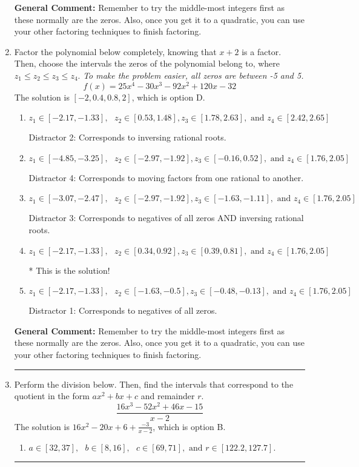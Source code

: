 \documentclass{extbook}[14pt]
\newcommand{\litem}[1]{\item #1

\rule{\textwidth}{0.4pt}}
\begin{document}
\begin{enumerate}
{\textbf{General Comment:} Remember to try the middle-most integers first as these normally are the zeros. Also, once you get it to a quadratic, you can use your other factoring techniques to finish factoring.
}
\litem{
Factor the polynomial below completely, knowing that $x + 2$ is a factor. Then, choose the intervals the zeros of the polynomial belong to, where $z_1 \leq z_2 \leq z_3 \leq z_4$. \textit{To make the problem easier, all zeros are between -5 and 5.}
\[ f(x) = 25x^{4} -30 x^{3} -92 x^{2} +120 x -32 \]The solution is \( [-2, 0.4, 0.8, 2] \), which is option D.\begin{enumerate}[label=\Alph*.]
\item \( z_1 \in [-2.17, -1.33], \text{   }  z_2 \in [0.53, 1.48], z_3 \in [1.78, 2.63], \text{   and   } z_4 \in [2.42, 2.65] \)

 Distractor 2: Corresponds to inversing rational roots.
\item \( z_1 \in [-4.85, -3.25], \text{   }  z_2 \in [-2.97, -1.92], z_3 \in [-0.16, 0.52], \text{   and   } z_4 \in [1.76, 2.05] \)

 Distractor 4: Corresponds to moving factors from one rational to another.
\item \( z_1 \in [-3.07, -2.47], \text{   }  z_2 \in [-2.97, -1.92], z_3 \in [-1.63, -1.11], \text{   and   } z_4 \in [1.76, 2.05] \)

 Distractor 3: Corresponds to negatives of all zeros AND inversing rational roots.
\item \( z_1 \in [-2.17, -1.33], \text{   }  z_2 \in [0.34, 0.92], z_3 \in [0.39, 0.81], \text{   and   } z_4 \in [1.76, 2.05] \)

* This is the solution!
\item \( z_1 \in [-2.17, -1.33], \text{   }  z_2 \in [-1.63, -0.5], z_3 \in [-0.48, -0.13], \text{   and   } z_4 \in [1.76, 2.05] \)

 Distractor 1: Corresponds to negatives of all zeros.
\end{enumerate}

\textbf{General Comment:} Remember to try the middle-most integers first as these normally are the zeros. Also, once you get it to a quadratic, you can use your other factoring techniques to finish factoring.
}
\litem{
Perform the division below. Then, find the intervals that correspond to the quotient in the form $ax^2+bx+c$ and remainder $r$.
\[ \frac{16x^{3} -52 x^{2} +46 x -15}{x -2} \]The solution is \( 16x^{2} -20 x + 6 + \frac{-3}{x -2} \), which is option B.\begin{enumerate}[label=\Alph*.]
\item \( a \in [32, 37], \text{   } b \in [8, 16], \text{   } c \in [69, 71], \text{   and   } r \in [122.2, 127.7]. \)


\end{enumerate}}
\end{enumerate}
\end{document}

